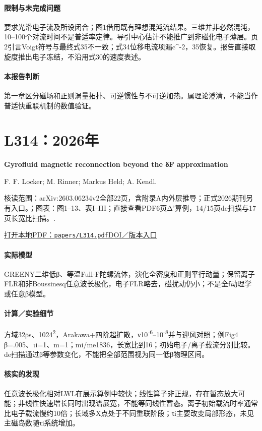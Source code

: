 \paragraph{限制与未完成问题}要求光滑电子流及所设闭合；图1借用既有理想混沌流结果。三维并非必然混沌，10–100个对流时间不是普适率定律。导引中心估计不能推广到非磁化电子薄层。页2引言Voigt符号与最终式35不一致；式34位移电流项漏c\textasciicircum{}-2，35恢复。报告直接取旋度推出电子冻结，不沿用式30的速度表述。

\paragraph{本报告判断}第一章区分磁场和正则涡量拓扑、可逆惯性与不可逆加热。属理论澄清，不能当作普适快重联机制的数值验证。

\section{L314：2026年}\label{paper:L314}

\textbf{Gyrofluid magnetic reconnection beyond the δF approximation}\citep{L314}\

F. F. Locker;  M. Rinner;  Markus Held;  A. Kendl.

\textsf{核读范围：}arXiv:2603.06234v2全部22页，含附录A内外层推导；正式2026期刊另有入口。；\textsf{图表：}图1–13、表I–III；直接查看PDF6页Δ'算例，14/15页de扫描与17页长宽比扫描。.

\href{run:papers/L314.pdf}{打开本地PDF：\texttt{papers/L314.pdf}}\quad\href{https://doi.org/10.1063/5.0332416}{DOI／版本入口}

\paragraph{实际模型}GREENY二维低β、等温Full-F陀螺流体，演化全密度和正则平行动量；保留离子FLR和非Boussinesq任意波长极化，电子FLR略去，磁扰动仍小；不是全f动理学或任意β模型。

\paragraph{计算／实验细节}方域32ρs、1024\textsuperscript{2}，Arakawa+四阶超扩散，ν10\textsuperscript{-6}–10\textsuperscript{-8}并与迎风对照；例Fig4 β=.005、τi=1、m=1；mi/me1836，长宽比到16；初始电子/离子载流分别比较。de扫描通过β等参数变化，不能把全部范围视为同一低β物理区间。

\paragraph{核实的发现}任意波长极化相对LWL在展示算例中较快；线性算子非正规，存在暂态放大可能；非线性快速增长同时出现谱展宽，不能等同线性暂态。离子初始载流时率通常比电子载流慢约10倍；长域多X点处于不同重联阶段；τi主要改变局部形态，未见主磁岛数随τi系统增加。

